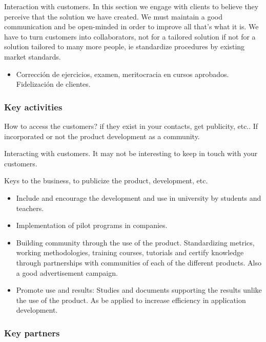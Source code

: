 \documentclass[11pt]{scrartcl}
\begin{document}
\par Interaction with customers. In this section we engage with clients to believe they perceive that the solution we have created. We must maintain a good communication and be open-minded in order to improve all that's what it is. We have to turn customers into collaborators, not for a tailored solution if not for a solution tailored to many more people, ie standardize procedures by existing market standards.

\begin{itemize}
    \item Corrección de ejercicios, examen, meritocracia en cursos aprobados. Fidelización de clientes.
\end{itemize}

\subsubsection{Key activities}

\par How to access the customers? if they exist in your contacts, get publicity, etc.. If incorporated or not the product development as a community.

\par Interacting with customers. It may not be interesting to keep in touch with your customers.

\par Keys to the business, to publicize the product, development, etc.
\begin{itemize}
    \item Include and encourage the development and use in university by students and teachers.
    \item Implementation of pilot programs in companies.
    \item Building community through the use of the product. Standardizing metrics, working methodologies, training courses, tutorials and certify knowledge through partnerships with communities of each of the different products. Also a good advertisement campaign.
    \item Promote use and results: Studies and documents supporting the results unlike the use of the product. As be applied to increase efficiency in application development.
\end{itemize}

\subsubsection{Key partners}
\end{document}

